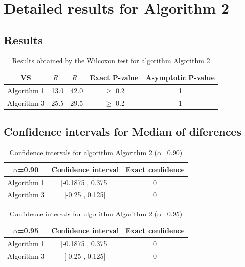 \documentclass[a4paper,10pt]{article}
\begin{document}
 \clearpage 


\section{Detailed results for Algorithm 2}


\subsection{Results}

\begin{table}[!htp]
\centering\small
\begin{tabular}{
|c|c|c|c|c|}
\hline
 VS & $R^{+}$ & $R^{-}$ & Exact P-value & Asymptotic P-value \\ \hline 
Algorithm 1 & 13.0 & 42.0 & $\geq$ 0.2 & 1\\ \hline 
Algorithm 3 & 25.5 & 29.5 & $\geq$ 0.2 & 1\\ \hline 

\end{tabular}
\caption{Results obtained by the Wilcoxon test for algorithm Algorithm 2}
\end{table}

\subsection{Confidence intervals for Median of diferences}

\begin{table}[!htp]
\centering\small
\begin{tabular}{
|c|c|c|}
\hline
 $\alpha$=0.90 & Confidence interval & Exact confidence \\ \hline 
Algorithm 1 & [-0.1875 , 0.375] & 0\\ \hline 
Algorithm 3 & [-0.25 , 0.125] & 0\\ \hline 

\end{tabular}
\caption{Confidence intervals for algorithm Algorithm 2 ($\alpha$=0.90)}
\end{table}
\begin{table}[!htp]
\centering\small
\begin{tabular}{
|c|c|c|}
\hline
 $\alpha$=0.95 & Confidence interval & Exact confidence \\ \hline 
Algorithm 1 & [-0.1875 , 0.375] & 0\\ \hline 
Algorithm 3 & [-0.25 , 0.125] & 0\\ \hline 

\end{tabular}
\caption{Confidence intervals for algorithm Algorithm 2 ($\alpha$=0.95)}
\end{table}
\end{document}
